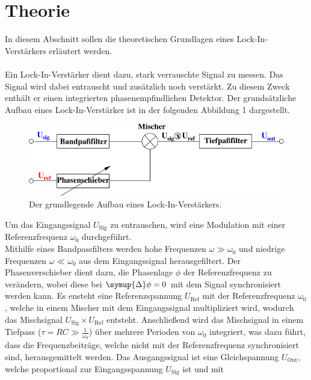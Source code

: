 \section{Theorie}
\label{sec:theorie}

    In diesem Abschnitt sollen die theoretischen Grundlagen eines Lock-In-Verstärkers erläutert
    werden.\\
    \\
    Ein Lock-In-Verstärker dient dazu, 
    stark verrauschte Signal zu messen.
    Das Signal wird dabei entrauscht und zusätzlich noch verstärkt. 
    Zu diesem Zweck enthält er einen integrierten phasenempfindlichen Detektor. 
    Der grundsätzliche Aufbau eines Lock-In-Verstärker ist in der folgenden Abbildung 1 dargestellt.
    \begin{figure}[H]
        \centering
        \includegraphics[scale=1]{content/img/Abb_1.pdf}
        \caption{Der grundlegende Aufbau eines Lock-In-Verstärkers.}
        \label{fig:grundaufbau}
    \end{figure}
    Um das Eingangssignal $U_\text{Sig}$ zu entrauschen, 
    wird eine Modulation mit einer Referenzfrequenz $\omega_0$ durchgeführt.\\
    Mithilfe eines Bandpassfilters werden hohe Frequenzen $\omega \gg \omega_0$ und niedrige Frequenzen $\omega \ll \omega_0$ aus dem Eingangssignal herausgefiltert. 
    Der Phasenverschieber dient dazu, 
    die Phasenlage $\phi$ der Referenzfrequenz zu verändern, 
    wobei diese bei $\symup{\Delta}\phi = 0$ mit dem Signal synchronisiert werden kann. 
    Es ensteht eine Referenzspannung $U_\text{Ref}$ mit der Referenzfrequenz $\omega_0$,
    welche in einem Mischer mit dem Eingangssignal multipliziert wird,
    wodurch das Mischsignal $U_\text{Sig} \times U_\text{Ref}$ entsteht. 
    Anschließend wird das Mischsignal in einem Tiefpass ($\tau = RC \gg \frac{1}{\omega_0}$) über mehrere Perioden von $\omega_0$ integriert, 
    was dazu führt, dass die Frequenzbeiträge, 
    welche nicht mit der Referenzfrequenz synchronisiert sind, 
    herausgemittelt werden. 
    Das Ausgangssignal ist eine Gleichspannung $U_\text{Out}$, welche
    proportional zur Eingangsspannung $U_\text{Sig}$ ist und mit
